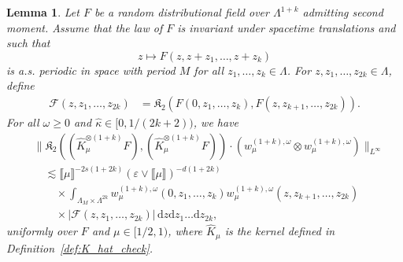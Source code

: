 \documentclass{article}
\numberwithin{equation}{section}
\newcommand{\mathd}{\mathrm{d}}
\theoremstyle{plain}
\newtheorem{lemma}[theorem]{Lemma}
\theoremstyle{definition}
\begin{document}
\begin{lemma}
  \label{lem:kolmogorov-aux}Let $F$ be a random distributional field over $\Lambda^{1+k}$ admitting second moment.
  Assume that the law of $F$ is invariant under spacetime translations and such that
  \begin{equation}
    z \mapsto F (z, z + z_1, \ldots, z + z_k)
    \label{eq:F-periodicity-lem}
  \end{equation}
  is a.s. periodic in space with period $M$ for all $z_1, \ldots, z_k \in
  \Lambda$. For $z, z_1, \ldots, z_{2 k} \in \Lambda$, define
  \begin{align*}
    \mathcal{F} (z, z_1, \ldots, z_{2 k})
    &=\mathfrak{K}_2 (F (0, z_1, \ldots, z_k),
    F (z, z_{k + 1}, \ldots, z_{2 k}))
    .
  \end{align*} 
  For all $\omega \geqslant 0$ and $\hat{\kappa} \in [0, 1 / (2 k + 2))$, we
  have
  \begin{align*}
    &\| \mathfrak{K}_2 ((\hat{K}^{\otimes (1 + k)}_{\mu} F),
    (\hat{K}^{\otimes (1 + k)}_{\mu} F))
    \cdot (w^{(1 + k), \omega}_{\mu}
    \otimes w^{(1 + k), \omega}_{\mu}) \|_{L^{\infty}}\\
    &\quad \lesssim \llbracket \mu \rrbracket^{- 2 s (1 + 2 k)}
    (\varepsilon \vee \llbracket \mu \rrbracket)^{- d (1 + 2 k)}\\
    &\qquad \times \int_{\Lambda_M \times \Lambda^{2 k}}
    w^{(1 + k), \omega}_{\mu} (0, z_1, \ldots, z_k)
    w^{(1 + k), \omega}_{\mu} (z, z_{k + 1}, \ldots, z_{2 k})\\
    &\qquad \times
    | \mathcal{F} (z, z_1, \ldots, z_{2 k}) |
    \,\mathd z \mathd z_1 \ldots \mathd z_{2 k},
  \end{align*}
  uniformly over $F$ and $\mu \in [1 / 2, 1)$, where \(\hat K_\mu\) is the kernel defined in
  Definition~\ref{def:K_hat_check}.
\end{lemma}
\end{document}
